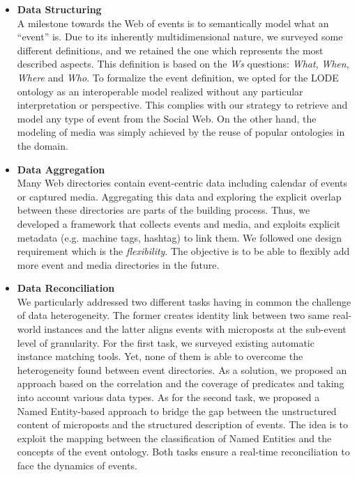 \begin{itemize}
\item \textbf{Data Structuring} 
\vspace{1mm}
\\
A milestone towards the Web of events is to semantically model what an ``event'' is. Due to its  inherently multidimensional nature, we surveyed some different definitions, and we retained the one which represents the most described aspects. This definition is based on the \textit{Ws} questions: \textit{What}, \textit{When}, \textit{Where} and \textit{Who}. To formalize the event definition, we opted for the LODE ontology as an interoperable model realized without any particular interpretation or perspective. This complies with our strategy to retrieve and model any type of event from the Social Web. On the other hand, the modeling of media was simply achieved by the reuse of popular ontologies in the domain.

\item \textbf{Data Aggregation}
\vspace{2mm} 
\\
Many Web directories contain event-centric data including calendar of events or captured media. Aggregating this data and exploring the explicit overlap between these directories are parts of the building process. Thus, we developed a framework that collects events and media, and exploits explicit metadata (e.g. machine tags, hashtag) to link them. We followed one design requirement which is the \textit{flexibility}. The objective is to be able to flexibly add more event and media directories in the future.

\item \textbf{Data Reconciliation}
\vspace{2mm}  
\\
We particularly addressed two different tasks having in common the challenge of data heterogeneity. The former creates identity link between two same real-world instances and the latter aligns events with microposts at the sub-event level of granularity. For the first task, we surveyed existing automatic instance matching tools. Yet, none of them is able to overcome the heterogeneity found between event directories. As a solution, we proposed an approach based on the correlation and the coverage of predicates and taking into account various data types. As for the second task, we proposed a Named Entity-based approach to bridge the gap between the unstructured content of microposts and the structured description of events. The idea is to exploit the mapping between the classification of Named Entities and the concepts of the event ontology. Both tasks ensure a real-time reconciliation to face the dynamics of events.


\end{itemize}
